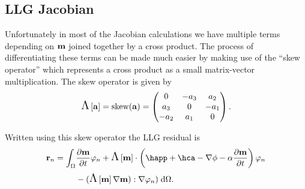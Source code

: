 \subsection{LLG Jacobian}
\label{sec:llg-jacobian}

Unfortunately in most of the Jacobian calculations we have multiple terms depending on $\mathbf{m}$ joined together by a cross product.
The process of differentiating these terms can be made much easier by making use of the ``skew operator'' which represents a cross product as a small matrix-vector multiplication.
The skew operator is given by
\begin{equation}
  \text{\Large{$\Lambda$}}\left[ {\mathbf{a}} \right] = \text{skew}({\mathbf{a}}) =
  \begin{pmatrix}
    0 & -a_3 & a_2 \\
    a_3 & 0 & -a_1 \\
    -a_2 & a_1 & 0
  \end{pmatrix}.
  \label{eqn:skew}
\end{equation}

Written using this skew operator the LLG residual is
\begin{equation}
  \begin{aligned}
    \rllgv_n = \int_{\magd}
    & \dmdt \tbf_n + \skewm{\mv} \cdot \left( \happ + \hca - \nabla \phi - \dampc \dmdt
    \right) \tbf_n \\
    &- (\skewm{\mv} \grad \mv) : \grad \tbf_n)
    \d\magd.
  \end{aligned}
\end{equation} 


